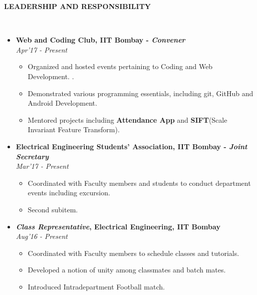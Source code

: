 \documentclass[a4paper,10pt]{article}
\newcommand{\isep}{-2 pt}
\newcommand{\lsep}{-0.5cm}
\newcommand{\resheading}[1]{{\small \colorbox{mygrey}{\begin{minipage}{0.975\textwidth}{\textbf{#1 \vphantom{p\^{E}}}}\end{minipage}}}}
\begin{document}
\resheading{\textbf{LEADERSHIP AND RESPONSIBILITY} }\\[\lsep]
\begin{itemize}
\item \textbf{Web and Coding Club, IIT Bombay - \emph{Convener} 
}  \\
 \emph{Apr'17 - Present} \\[-0.6cm]
	\begin{itemize}\itemsep \isep
	\item Organized and hosted events pertaining to Coding and Web Development.
.
	\item Demonstrated various programming essentials, including git, GitHub and Android Development.

	\item Mentored projects including \textbf{Attendance App} and \textbf{SIFT}(Scale Invariant Feature Transform).

	\end{itemize}

\item \textbf{Electrical Engineering Students' Association, IIT Bombay - \emph{Joint Secretary}
}  \\
 \emph{ Mar'17 - Present} \\[-0.6cm]
	\begin{itemize}\itemsep \isep
	\item Coordinated with Faculty members and students to conduct department events including excursion.
	\item Second subitem.
	\end{itemize}

\item \textbf{\emph{Class Representative}, Electrical Engineering, IIT Bombay
}  \\
 \emph{ Aug'16 - Present} \\[-0.6cm]
	\begin{itemize}\itemsep \isep
	\item Coordinated with Faculty members to schedule classes and tutorials.
	\item Developed a notion of unity among classmates and batch mates.
	\item Introduced Intradepartment Football match.
	\end{itemize}
\end{itemize}
\end{document}
